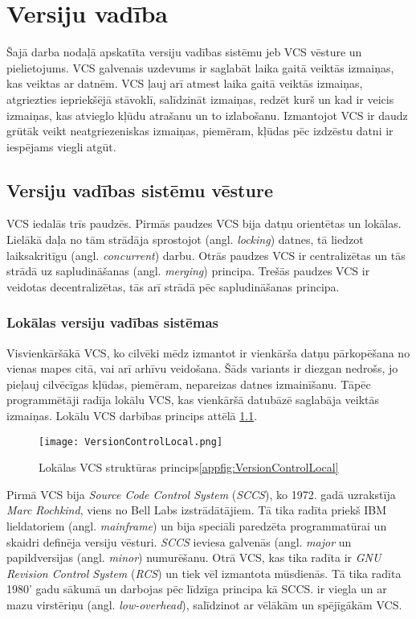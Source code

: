 \chapter{Versiju vadība}


Šajā darba nodaļā apskatīta versiju vadības sistēmu jeb VCS vēsture un pielietojums. VCS galvenais uzdevums ir saglabāt laika gaitā veiktās izmaiņas, kas veiktas ar datnēm. VCS ļauj arī atmest laika gaitā veiktās izmaiņas, atgriezties iepriekšējā stāvoklī, salīdzināt izmaiņas, redzēt kurš un kad ir veicis izmaiņas, kas atvieglo kļūdu atrašanu un to izlabošanu. Izmantojot VCS ir daudz grūtāk veikt neatgriezeniskas izmaiņas, piemēram, kļūdas pēc izdzēstu datni ir iespējams viegli atgūt.

\section{Versiju vadības sistēmu vēsture}
VCS iedalās trīs paudzēs. Pirmās paudzes VCS bija datņu orientētas un lokālas. Lielākā daļa no tām strādāja sprostojot (angl. \textit{locking}) datnes, tā liedzot laiksakritīgu (angl. \textit{concurrent}) darbu.
Otrās paudzes VCS ir centralizētas un tās strādā uz sapludināšanas (angl. \textit{merging}) principa.
Trešās paudzes VCS ir veidotas decentralizētas, tās arī strādā pēc sapludināšanas principa.
\cite[history]{raymondVCS}
\subsection{Lokālas versiju vadības sistēmas}
Visvienkāršākā VCS, ko cilvēki mēdz izmantot ir vienkārša datņu pārkopēšana no vienas mapes citā, vai arī arhīvu veidošana. Šāds variants ir diezgan nedrošs, jo pieļauj cilvēcīgas kļūdas, piemēram, nepareizas datnes izmainīšanu. Tāpēc programmētāji radīja lokālu VCS, kas vienkāršā datubāzē saglabāja veiktās izmaiņas. Lokālu VCS darbības princips attēlā \ref{fig:VersionControlLocal}.
\begin{figure}[H]%
	\centering
	\captionsetup{justification=centering}
	\texttt{[image: VersionControlLocal.png]}
	\caption{Lokālas VCS struktūras princips\ref{appfig:VersionControlLocal}}
	\label{fig:VersionControlLocal}
\end{figure}
Pirmā VCS bija \textit{Source Code Control System} (\textit{SCCS}), ko 1972. gadā uzrakstīja \textit{Marc Rochkind}, viens no Bell Labs izstrādātājiem. Tā tika radīta priekš IBM lieldatoriem (angl. \textit{mainframe}) un bija speciāli paredzēta programmatūrai un skaidri definēja versiju vēsturi. \textit{SCCS} ieviesa galvenās (angl. \textit{major} un papildversijas (angl. \textit{minor}) numurēšanu.
Otrā VCS, kas tika radīta ir \textit{GNU Revision Control System} (\textit{RCS}) un tiek vēl izmantota mūsdienās. Tā tika radīta 1980' gadu sākumā un darbojas pēc līdzīga principa kā SCCS.  ir viegla un ar mazu virstēriņu (angl. \textit{low-overhead}), salīdzinot ar vēlākām un spējīgākām VCS.

